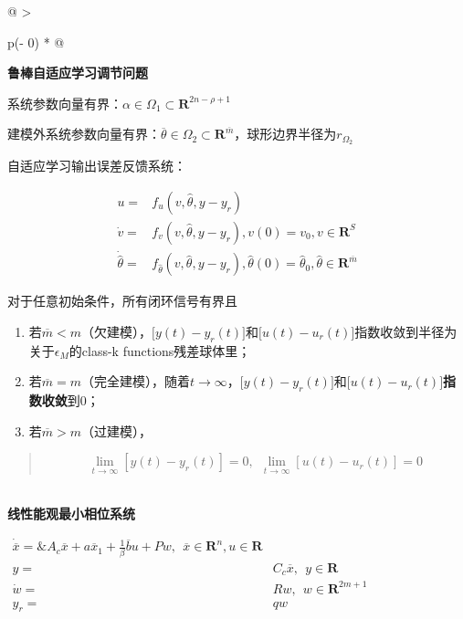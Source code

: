 \documentclass[
  12pt,
  a4paper
]{article}
\begin{document}
\begin{longtable}[]{@{}
  >{\raggedright\arraybackslash}p{}@{}}
\toprule\noalign{}
\begin{minipage}[b]{\linewidth}\raggedright
\textbf{鲁棒自适应学习调节问题}

系统参数向量有界：\(\alpha \in \Omega_{1} \subset \mathbf{R}^{2n - \rho + 1}\)

建模外系统参数向量有界：\(\overline{\theta} \in \Omega_{2} \subset \mathbf{R}^{\overline{m}}\)，球形边界半径为\(r_{\Omega_{2}}\)

自适应学习输出误差反馈系统：

\[\begin{aligned}
u = & f_{u}\left( v,\widehat{\theta},y - y_{r} \right) \\
\dot{v} = & f_{v}\left( v,\widehat{\theta},y - y_{r} \right),v(0) = v_{0},v \in \mathbf{R}^{S} \\
\dot{\widehat{\theta}} = & f_{\widehat{\theta}}\left( v,\widehat{\theta},y - y_{r} \right),\widehat{\theta}(0) = {\widehat{\theta}}_{0},\widehat{\theta} \in \mathbf{R}^{\overline{m}}
\end{aligned}\]

对于任意初始条件，所有闭环信号有界且

\begin{enumerate}
\def\labelenumi{\roman{enumi}.}
\item
  若\(\overline{m} < m\)（欠建模），\(\lbrack y(t) - y_{r}(t)\rbrack\)和\(\lbrack u(t) - u_{r}(t)\rbrack\)指数收敛到半径为关于\(\epsilon_{M}\)的class-k
  functions残差球体里；
\item
  若\(\overline{m} = m\)（完全建模），随着\(t \rightarrow \infty\)，\(\lbrack y(t) - y_{r}(t)\rbrack\)和\(\lbrack u(t) - u_{r}(t)\rbrack\)\textbf{指数收敛}到0；
\item
  若\(\overline{m} > m\)（过建模），
\end{enumerate}

\begin{quote}
\[\lim_{t \rightarrow \infty}{\left\lbrack y(t) - y_{r}(t) \right\rbrack = 0},\ \ \lim_{t \rightarrow \infty}{\left\lbrack u(t) - u_{r}(t) \right\rbrack = 0}\]
\end{quote}
\end{minipage} \\
\midrule\noalign{}
\endhead
\bottomrule\noalign{}
\endlastfoot
\textbf{线性能观最小相位系统}

\(\begin{aligned}
\dot{\overline{x}}\mathbf{= \&}A_{c}\overline{x} + a{\overline{x}}_{1} + \frac{1}{\beta}\overline{b}u + Pw,\ \ \overline{x} \in \mathbf{R}^{n},u \in \mathbf{R} \\
y = & C_{c}\overline{x},\ \ y \in \mathbf{R} \\
\dot{w} = & Rw,\ \ w \in \mathbf{R}^{2m + 1} \\
y_{r} = & qw
\end{aligned}\)


\end{longtable}
\end{document}
